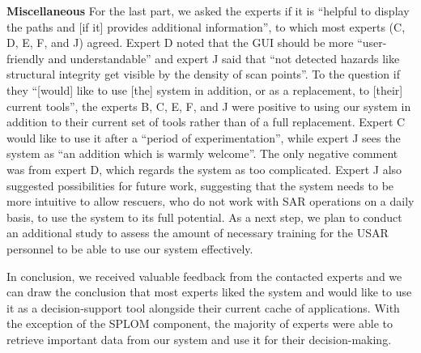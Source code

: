 \documentclass[review,journal]{vgtc}         %
\begin{document}
\noindent \textbf{Miscellaneous} For the last part, we asked the experts if it is ``helpful to display the paths and [if it] provides additional information'', to which most experts (C, D, E, F, and J) agreed. Expert D noted that the GUI should be more ``user-friendly and understandable'' and expert J said that ``not detected hazards like structural integrity get visible by the density of scan points''. To the question if they ``[would] like to use [the] system in addition, or as a replacement, to [their] current tools'', the experts B, C, E, F, and J were positive to using our system in addition to their current set of tools rather than of a full replacement. Expert C would like to use it after a ``period of experimentation'', while expert J sees the system as ``an addition which is warmly welcome''. The only negative comment was from expert D, which regards the system as too complicated. Expert J also suggested possibilities for future work, suggesting that the system needs to be more intuitive to allow rescuers, who do not work with SAR operations on a daily basis, to use the system to its full potential. As a next step, we plan to conduct an additional study to assess the amount of necessary training for the USAR personnel to be able to use our system effectively.

In conclusion, we received valuable feedback from the contacted experts and we can draw the conclusion that most experts liked the system and would like to use it as a decision-support tool alongside their current cache of applications. With the exception of the SPLOM component, the majority of experts were able to retrieve important data from our system and use it for their decision-making.

\end{document}
